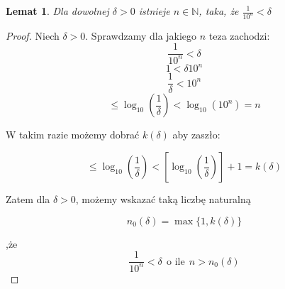 \documentclass{article}
\newtheorem{lemma}{Lemat}
\begin{document}
\begin{lemma}
    Dla dowolnej \(\delta > 0\) istnieje \(n \in \mathbb{N}\), taka, że \(\frac{1}{10^{n}} < \delta\)
\end{lemma}
\begin{proof}
    Niech \(\delta > 0\). Sprawdzamy dla jakiego \(n\) teza zachodzi:
\begin{equation*}
    \frac{1}{10^n} < \delta
\end{equation*}
\begin{equation*}
    1 < \delta 10^n
\end{equation*}
\begin{equation*}
    \frac{1}{\delta} < 10^n
\end{equation*}
\begin{equation*}
    [\log_{10}(\frac{1}{\delta})] \leq \log_{10}(\frac{1}{\delta})  < \log_{10}(10^n) = n
\end{equation*}

W takim razie możemy dobrać \(k(\delta)\) aby zaszło:

\begin{equation*}
    [\log_{10}(\frac{1}{\delta})] \leq \log_{10}(\frac{1}{\delta}) < [\log_{10}(\frac{1}{\delta})] + 1 = k(\delta)
\end{equation*}

Zatem dla \(\delta > 0 \), możemy wskazać taką liczbę naturalną

\begin{equation*}
    n_0(\delta) = \max\{1, k(\delta)\}
\end{equation*}

,że
\begin{equation*}
    \frac{1}{10^n} < \delta \ \ \mbox{o ile} \ \ n > n_0(\delta)
\end{equation*}

\end{proof}
\end{document}
